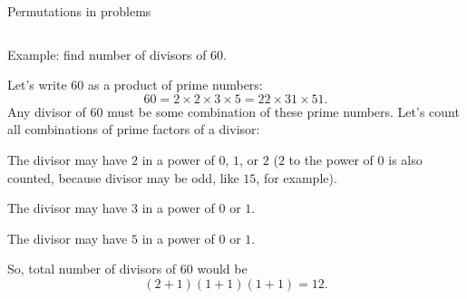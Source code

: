 \documentclass[9pt,aspectratio=169]{beamer}
\begin{document}
\begin{frame}{Permutations in problems}
\begin{columns}[T]
\begin{column}{0.5\textwidth}
      \begin{problem}
        {\color{textBlue} Example:} find number of divisors of $60$.
      \end{problem}

      {\small
      Let’s write $60$ as a product of prime numbers:
      \[ 60 = 2 \times 2 \times 3 \times 5 = 22 \times 31 \times 51.\]
      Any divisor of $60$ must be some combination of these prime numbers. Let’s count all combinations of prime factors of a divisor:

      The divisor may have $2$ in a power of $0$, $1$, or $2$ ($2$ to the power of $0$ is also counted, because divisor may be odd, like $15$, for example).

      The divisor may have $3$ in a power of $0$ or $1$.

      The divisor may have $5$ in a power of $0$ or $1$.

      So, total number of divisors of $60$ would be
      \[(2 + 1) (1 + 1) (1 + 1) = 12.\]
      }
    \end{column}
  \end{columns}
\end{frame}
\end{document}
